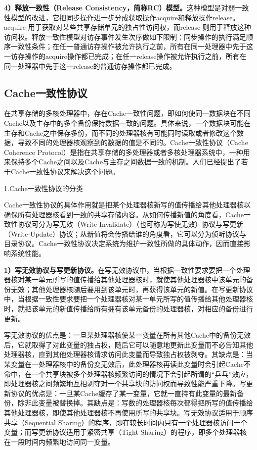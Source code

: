 \documentclass[]{ctexbook}
\begin{document}
\textbf{4）释放一致性（Release Consistency，简称RC）模型。}这种模型是对弱一致性模型的改进，它把同步操作进一步分成获取操作acquire和释放操作release。acquire 用于获取对某些共享存储单元的独占性访问权，而release 则用于释放这种访问权。释放一致性模型对访存事件发生次序做如下限制：同步操作的执行满足顺序一致性条件；在任一普通访存操作被允许执行之前，所有在同一处理器中先于这一访存操作的acquire操作都已完成；在任一release操作被允许执行之前，所有在同一处理器中先于这一release的普通访存操作都已完成。

\hypertarget{cacheux4e00ux81f4ux6027ux534fux8bae}{%
\subsection{Cache一致性协议}\label{cacheux4e00ux81f4ux6027ux534fux8bae}}

在共享存储的多核处理器中，存在Cache一致性问题，即如何使同一数据块在不同Cache以及主存中的多个备份保持数据一致的问题。具体来说，一个数据块可能在主存和Cache之中保存多份，而不同的处理器核有可能同时读取或者修改这个数据，导致不同的处理器核观察到的数据的值是不同的。Cache一致性协议（Cache Coherence Protocol）是指在共享存储的多处理器或者多核处理器系统中，一种用来保持多个Cache之间以及Cache与主存之间数据一致的机制。人们已经提出了若干Cache一致性协议来解决这个问题。

1.Cache一致性协议的分类

Cache一致性协议的具体作用就是把某个处理器核新写的值传播给其他处理器核以确保所有处理器核看到一致的共享存储内容。从如何传播新值的角度看，Cache一致性协议可分为写无效（Write-Invalidate）（也可称为写使无效）协议与写更新（Write-Update）协议；从新值将会传播给谁的角度看，它可以分为侦听协议与目录协议。Cache一致性协议决定系统为维护一致性所做的具体动作，因而直接影响系统性能。

\textbf{1）写无效协议与写更新协议。}在写无效协议中，当根据一致性要求要把一个处理器核对某一单元所写的值传播给其他处理器核时，就使其他处理器核中该单元的备份无效；其他处理器核随后要用到该单元时，再获得该单元的新值。在写更新协议中，当根据一致性要求要把一个处理器核对某一单元所写的值传播给其他处理器核时，就把该单元的新值传播给所有拥有该单元备份的处理器核，对相应的备份进行更新。

写无效协议的优点是：一旦某处理器核使某一变量在所有其他Cache中的备份无效后，它就取得了对此变量的独占权，随后它可以随意地更新此变量而不必告知其他处理器核，直到其他处理器核请求访问此变量而导致独占权被剥夺。其缺点是：当某变量在一处理器核中的备份变无效后，此处理器核再读此变量时会引起Cache不命中，在一个共享块被多个处理器核频繁访问的情况下会引起所谓的``乒乓''效应，即处理器核之间频繁地互相剥夺对一个共享块的访问权而导致性能严重下降。写更新协议的优点是：一旦某Cache缓存了某一变量，它就一直持有此变量的最新备份，除非此变量被替换掉。其缺点是：写数的处理器核每次都得把所写的值传播给其他处理器核，即使其他处理器核不再使用所写的共享块。写无效协议适用于顺序共享（Sequential Sharing）的程序，即在较长时间内只有一个处理器核访问一个变量；而写更新协议适用于紧密共享（Tight Sharing）的程序，即多个处理器核在一段时间内频繁地访问同一变量。
\end{document}
